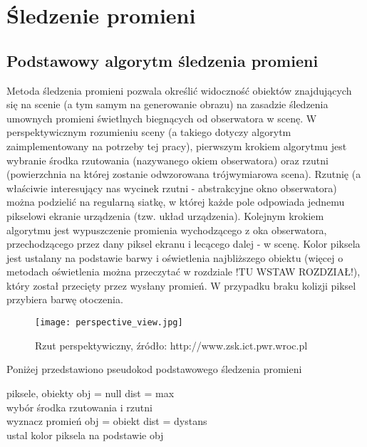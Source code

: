 \section{Śledzenie promieni}

\subsection{Podstawowy algorytm śledzenia promieni}

Metoda śledzenia promieni pozwala określić widoczność obiektów znajdujących
się na scenie (a tym samym na generowanie obrazu) na zasadzie śledzenia umownych promieni świetlnych biegnących od obserwatora w scenę. W perspektywicznym rozumieniu sceny (a takiego dotyczy algorytm zaimplementowany na potrzeby tej pracy), pierwszym krokiem algorytmu jest wybranie środka rzutowania (nazywanego okiem obserwatora) oraz rzutni (powierzchnia na której zostanie odwzorowana trójwymiarowa scena). Rzutnię (a właściwie interesujący nas wycinek rzutni - abstrakcyjne okno obserwatora) można podzielić na regularną siatkę, w której każde pole odpowiada jednemu pikselowi ekranie urządzenia (tzw. układ urządzenia). Kolejnym krokiem algorytmu jest wypuszczenie promienia wychodzącego z oka obserwatora, przechodzącego przez dany piksel ekranu i lecącego dalej - w scenę. Kolor piksela jest ustalany na podstawie barwy i oświetlenia najbliższego obiektu (więcej o metodach oświetlenia można przeczytać w rozdziale !TU WSTAW ROZDZIAŁ!), który został przecięty przez wysłany promień. W przypadku braku kolizji piksel przybiera barwę otoczenia. 

\begin{figure}[H]
\centering
  \caption{Rzut perspektywiczny, źródło: http://www.zsk.ict.pwr.wroc.pl}
  \texttt{[image: perspective\_view.jpg]}
\end{figure}

\noindent
Poniżej przedstawiono pseudokod podstawowego śledzenia promieni

\begin{algorithm}
\begin{algorithmic}
\State piksele, obiekty
\State obj = null
\State dist = max
\\
\State wybór środka rzutowania i rzutni
\\
	 \State wyznacz promień
    		\State obj = obiekt
    		\State dist = dystans
     \EndIf
	 \EndFor
\EndFor
\\
\State ustal kolor piksela na podstawie obj
\end{algorithmic}
\end{algorithm}


